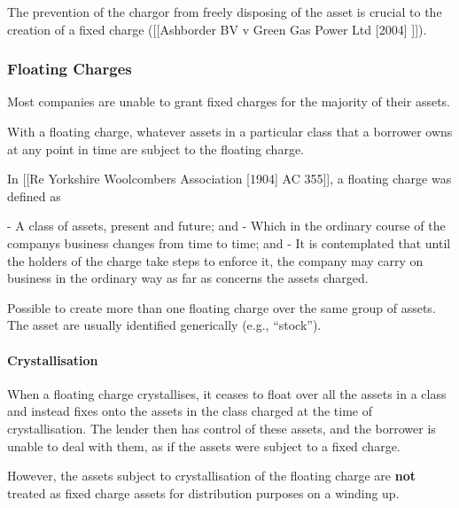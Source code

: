 \documentclass[
]{article}
\newenvironment{Shaded}{}{}
\newcommand{\NormalTok}[1]{#1}
\begin{document}
The prevention of the chargor from freely disposing of the asset is
crucial to the creation of a fixed charge ({[}{[}Ashborder BV v Green
Gas Power Ltd {[}2004{]} {]}{]}).

\hypertarget{floating-charges}{%
\subsubsection{Floating Charges}\label{floating-charges}}

Most companies are unable to grant fixed charges for the majority of
their assets.

With a floating charge, whatever assets in a particular class that a
borrower owns at any point in time are subject to the floating charge.

\begin{Shaded}
\begin{Highlighting}[]
\NormalTok{In [[Re Yorkshire Woolcombers Association [1904] AC 355]], a floating charge was defined as}

\NormalTok{{-} A class of assets, present and future; and}
\NormalTok{{-} Which in the ordinary course of the company\textquotesingle{}s business changes from time to time; and}
\NormalTok{{-} It is contemplated that until the holders of the charge take steps to enforce it, the company may carry on business in the ordinary way as far as concerns the assets charged.}
\end{Highlighting}
\end{Shaded}

Possible to create more than one floating charge over the same group of
assets. The asset are usually identified generically (e.g., ``stock'').

\hypertarget{crystallisation}{%
\paragraph{Crystallisation}\label{crystallisation}}

When a floating charge crystallises, it ceases to float over all the
assets in a class and instead fixes onto the assets in the class charged
at the time of crystallisation. The lender then has control of these
assets, and the borrower is unable to deal with them, as if the assets
were subject to a fixed charge.

However, the assets subject to crystallisation of the floating charge
are \textbf{not} treated as fixed charge assets for distribution
purposes on a winding up.
\end{document}
